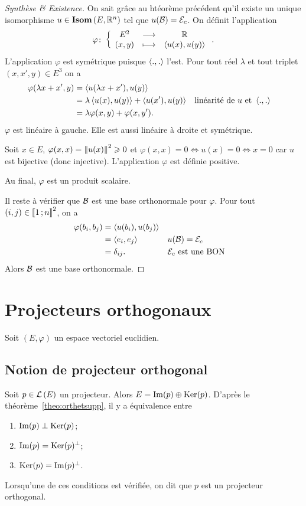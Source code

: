 \begin{proof}[Synthèse \& Existence]
  On sait grâce au htéorème précédent qu'il existe un unique isomorphisme $u \in \mathbf{Isom}\left(E,\mathbb{R}^n\right)$ tel que $u(\mathcal{B})=\mathcal{E}_c$. On définit l'application
  \begin{equation}
    \varphi\colon \left\{\begin{array}{ccc} E^2 & \longrightarrow &\mathbb{R}\\ (x,y) & \longmapsto & \left\langle{u(x)},{u(y)}\right\rangle \end{array} \right..
  \end{equation}
  L'application $\varphi$ est symétrique puisque $\left\langle{.},{.}\right\rangle$ l'est. Pour tout réel $\lambda$ et tout triplet $(x,x',y) \in E^3$ on a
  \begin{align}
    \varphi(\lambda x+x',y) &= \left\langle{u(\lambda x+x')},{u(y)}\right\rangle \\
    &=\lambda \left\langle{u(x)},{u(y)}\right\rangle+ \left\langle{u(x')},{u(y)}\right\rangle && \text{linéarité de } u \text{~et~} \left\langle{.},{.}\right\rangle \\
    &=\lambda \varphi(x,y)+ \varphi(x,y').
  \end{align}
  $\varphi$ est linéaire à gauche. Elle est aussi linéaire à droite et symétrique.

  Soit $x \in E$, $\varphi(x,x)=\left\lVert u(x)\right\rVert^2 \geqslant 0$ et $\varphi(x,x)=0 \iff u(x)=0 \iff x=0$ car $u$ est bijective (donc injective). L'application $\varphi$ est définie positive.

  Au final, $\varphi$ est un produit scalaire.

  Il reste à vérifier que $\mathcal{B}$ est une base orthonormale pour $\varphi$. Pour tout $(i,j) \in \mathopen{\llbracket}1\mathclose{}\mathpunct{};n\mathclose{\rrbracket}^2$, on a
  \begin{align}
    \varphi(b_i,b_j) &= \left\langle{u(b_i)},{u(b_j)}\right\rangle \\
    &= \left\langle{e_i},{e_j}\right\rangle && u(\mathcal{B})=\mathcal{E}_c\\
    &=\delta_{ij}. && \mathcal{E}_c \text{~est une BON}
  \end{align}
  Alors $\mathcal{B}$ est une base orthonormale.
\end{proof}

\section{Projecteurs orthogonaux}

Soit $(E, \varphi)$ un espace vectoriel euclidien.

\subsection{Notion de projecteur orthogonal}

Soit $p \in \mathcal{L}\left(E\right)$ un projecteur. Alors $E = \operatorname{Im}(p)\oplus \operatorname{Ker}(p)$. D'après le théorème~\ref{theo:orthetsupp}, il y a équivalence entre
\begin{enumerate}
\item $\operatorname{Im}(p) \perp \operatorname{Ker}(p)$;
\item $\operatorname{Im}(p) = \operatorname{Ker}(p)^\perp$;
\item $\operatorname{Ker}(p) = \operatorname{Im}(p)^\perp$.
\end{enumerate}
Lorsqu'une de ces conditions est vérifiée, on dit que $p$ est un projecteur orthogonal.


